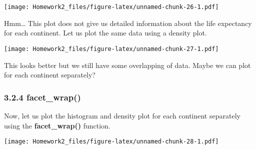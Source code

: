 \documentclass[]{article}
\newenvironment{Shaded}{\begin{snugshade}}{\end{snugshade}}
\newcommand{\KeywordTok}[1]{\textcolor[rgb]{0.13,0.29,0.53}{\textbf{{#1}}}}
\newcommand{\DataTypeTok}[1]{\textcolor[rgb]{0.13,0.29,0.53}{{#1}}}
\newcommand{\DecValTok}[1]{\textcolor[rgb]{0.00,0.00,0.81}{{#1}}}
\newcommand{\StringTok}[1]{\textcolor[rgb]{0.31,0.60,0.02}{{#1}}}
\newcommand{\CommentTok}[1]{\textcolor[rgb]{0.56,0.35,0.01}{\textit{{#1}}}}
\newcommand{\NormalTok}[1]{{#1}}
\begin{document}
\texttt{[image: Homework2\_files/figure-latex/unnamed-chunk-26-1.pdf]}

Hmm\ldots{} This plot does not give us detailed information about the
life expectancy for each continent. Let us plot the same data using a
density plot.

\begin{Shaded}
\end{Shaded}

\texttt{[image: Homework2\_files/figure-latex/unnamed-chunk-27-1.pdf]}

This looks better but we still have some overlapping of data. Maybe we
can plot for each continent separately?

\subsubsection{\texorpdfstring{3.2.4
\textbf{facet\_wrap()}}{3.2.4 facet\_wrap()}}\label{facet_wrap}

Now, let us plot the histogram and density plot for each continent
separately using the \textbf{facet\_wrap()} function.

\begin{Shaded}
\end{Shaded}

\texttt{[image: Homework2\_files/figure-latex/unnamed-chunk-28-1.pdf]}
\end{document}
